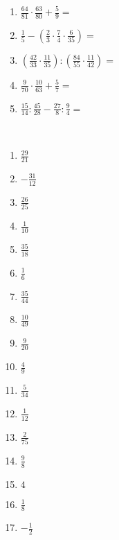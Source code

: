 \begin{Exercise}[title={Berechne die folgenden Ausdrücke und kürze soweit wie möglich}, label=bruecheA1]
\begin{minipage}{\textwidth}
\begin{minipage}{0.49\textwidth}
\begin{enumerate}[label=\alph*)]
				\item \(\frac{64}{81}\cdot\frac{63}{80}+\frac{5}{9}=\)
				\item \(\frac{1}{5}-\left( \frac{2}{3}\cdot \frac{7}{4}\cdot \frac{6}{35}\right) =\)
				\item \(\left( \frac{42}{33}\cdot\frac{11}{35}\right):\left(\frac{84}{55}\cdot\frac{11}{42}\right)  =\)
				\item \(\frac{9}{70}\cdot\frac{10}{63}+\frac{5}{7}=\)
				\item \(\frac{15}{14}:\frac{45}{28}-\frac{27}{8}:\frac{9}{4}=\)
			\end{enumerate}
		\end{minipage}
	\end{minipage}
\end{Exercise}
\newpage
\begin{Answer}[ref=bruecheA1]\\
	\begin{minipage}{\textwidth}
		\begin{minipage}{0.44\textwidth}
			\begin{enumerate}[label=\alph*)]
				\item \(\frac{29}{21}\)
				\item \(-\frac{31}{12}\)
				\item \(\frac{26}{25}\)
				\item \(\frac{1}{10}\)
				\item \(\frac{35}{18}\)
				\item \(\frac{1}{6}\)
				\item \(\frac{35}{44}\)
				\item \(\frac{10}{49}\)
				\item \(\frac{9}{20}\)
				\item \(\frac{4}{9}\)
				\item \(\frac{5}{34}\)
				\item \(\frac{1}{12}\)
				\item \(\frac{2}{75}\)
			\end{enumerate}
		\end{minipage}
		\begin{minipage}{0.54\textwidth}
			\begin{enumerate}[label=\alph*)]
				\setcounter{enumi}{13}
				\item \(\frac{9}{8}\)
				\item \(4\)
				\item \(\frac{1}{8}\)
				\item \(-\frac{1}{2}\)

\end{enumerate}
\end{minipage}
\end{minipage}
\end{Answer}
